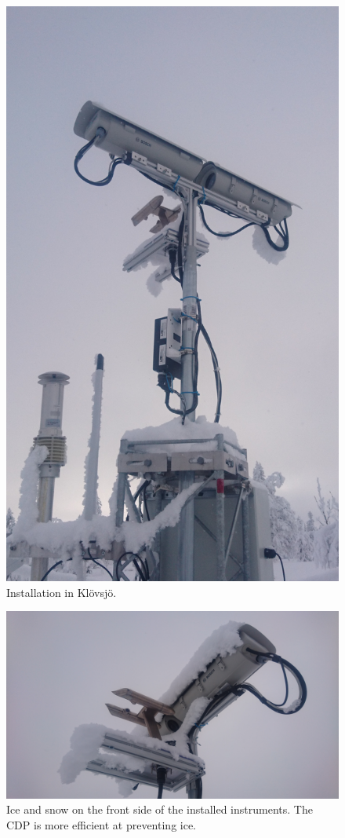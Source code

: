 \begin{figure}[ht]
\centering\includegraphics[width=0.75\linewidth]{figures/installation1}
\caption{Installation in Klövsjö.}
\label{fig:installation1}
\end{figure}

\begin{figure}[ht]
\centering\includegraphics[width=0.75\linewidth]{figures/installation3}
\caption{Ice and snow on the front side of the installed instruments. The CDP is more efficient at preventing ice.}
\label{fig:installation3}
\end{figure}

